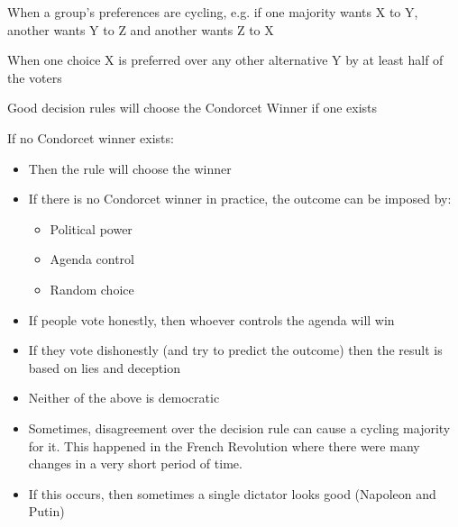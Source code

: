 \documentclass[11pt]{article}
\begin{document}
\begin{description}
\item[{Cycling majority}] When a group's preferences are cycling, e.g. if one
majority wants X to Y, another wants Y to Z and another wants Z to X
\item[{Condorcet Winner}] When one choice X is preferred over any other alternative
Y by at least half of the voters
\item Good decision rules will choose the Condorcet Winner if one exists
\item If no Condorcet winner exists:
\begin{itemize}
\item Then the rule will choose the winner
\item If there is no Condorcet winner in practice, the outcome can be imposed by:
\begin{itemize}
\item Political power
\item Agenda control
\item Random choice
\end{itemize}
\item If people vote honestly, then whoever controls the agenda will win
\item If they vote dishonestly (and try to predict the outcome) then the result is
based on lies and deception
\item Neither of the above is democratic
\item Sometimes, disagreement over the decision rule can cause a cycling majority
for it. This happened in the French Revolution where there were many changes
in a very short period of time.
\item If this occurs, then sometimes a single dictator looks good (Napoleon and
Putin)
\end{itemize}
\end{description}
\end{document}
